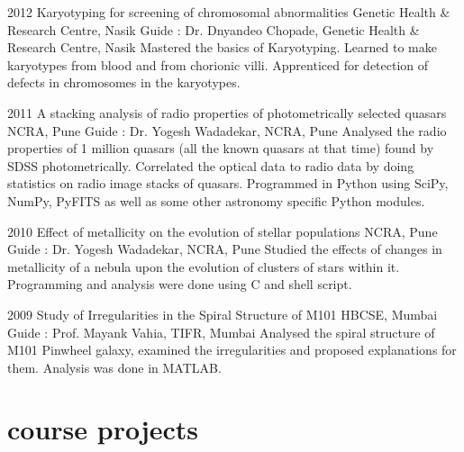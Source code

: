 \documentclass[11pt]{friggeri-cv}%
\begin{document}
\begin{entrylist}


  \entry
    {2012}
    {Karyotyping for screening of chromosomal abnormalities}
    {Genetic Health \& Research Centre, Nasik}
    {
    Guide : Dr. Dnyandeo Chopade, Genetic Health \& Research Centre, Nasik}
    {
    Mastered the basics of Karyotyping. Learned to make karyotypes from blood and from chorionic villi.  Apprenticed for  detection of defects in chromosomes in the karyotypes.
    }
    \end{entrylist}
    \begin{entrylist}


  \entry
    {2011}
    {A stacking analysis of radio properties of photometrically selected quasars}
    {NCRA, Pune}
    {
    Guide : Dr. Yogesh Wadadekar, NCRA, Pune}
    {Analysed the radio properties of 1 million quasars (all the known quasars at that time) found by SDSS photometrically. Correlated the optical data to radio data by doing statistics on radio image stacks of quasars. Programmed in Python using SciPy, NumPy, PyFITS as well as some other astronomy specific Python modules. 
    }
    \end{entrylist}
    \begin{entrylist}
  \entry
    {2010}
    {Effect of metallicity on the evolution of stellar populations}
    {NCRA, Pune}
    {
    Guide : Dr. Yogesh Wadadekar, NCRA, Pune}
    {Studied the effects of changes in metallicity of a nebula upon the evolution of clusters of stars within it. Programming and analysis were done using C and shell script.
    }

    \end{entrylist}
\begin{entrylist}
  \entry
    {2009}
    {Study of Irregularities in the Spiral Structure of M101}
    {HBCSE, Mumbai}
    {
    Guide : Prof. Mayank Vahia, TIFR, Mumbai}
    {Analysed the spiral structure of M101 Pinwheel galaxy, examined the irregularities  and proposed explanations for them. Analysis was done in MATLAB.
    }    
\end{entrylist}

\section{course projects}
\end{document}
